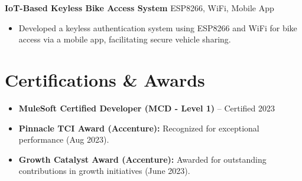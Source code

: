 \documentclass[letterpaper,10pt]{article}
\begin{document}
    \textbf{IoT-Based Keyless Bike Access System} \hfill ESP8266, WiFi, Mobile App
    \begin{itemize}[leftmargin=*]
        \item Developed a keyless authentication system using ESP8266 and WiFi for bike access via a mobile app, facilitating secure vehicle sharing.
    \end{itemize}

\section*{Certifications \& Awards}
    \begin{itemize}[leftmargin=*] \itemsep 0pt
        \item \textbf{MuleSoft Certified Developer (MCD - Level 1)} -- Certified 2023
        \item \textbf{Pinnacle TCI Award (Accenture):} Recognized for exceptional performance (Aug 2023).
        \item \textbf{Growth Catalyst Award (Accenture):} Awarded for outstanding contributions in growth initiatives (June 2023).
    \end{itemize}
\end{document}
